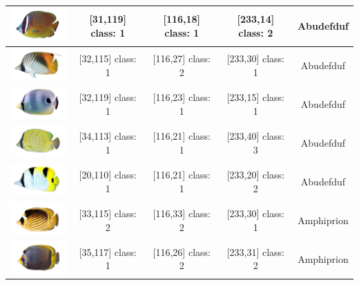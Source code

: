 \begin{longtable}{|c|c|c|c|c|}
	\includegraphics[width=3cm]{gambar/dataset_validasi/Chaetodon09} & [31,119] class: 1 & [116,18] class: 1 & [233,14] class: 2 & Abudefduf \\ \hline
	\includegraphics[width=3cm]{gambar/dataset_validasi/Chaetodon10} & [32,115] class: 1 & [116,27] class: 2 & [233,30] class: 1 & Abudefduf \\ \hline
	\includegraphics[width=3cm]{gambar/dataset_validasi/Chaetodon11} & [32,119] class: 1 & [116,23] class: 1 & [233,15] class: 1 & Abudefduf \\ \hline
	\includegraphics[width=3cm]{gambar/dataset_validasi/Chaetodon12} & [34,113] class: 1 & [116,21] class: 1 & [233,40] class: 3 & Abudefduf \\ \hline
	\includegraphics[width=3cm]{gambar/dataset_validasi/Chaetodon13} & [20,110] class: 1 & [116,21] class: 1 & [233,20] class: 2 & Abudefduf \\ \hline
	\includegraphics[width=3cm]{gambar/dataset_validasi/Chaetodon14} & [33,115] class: 2 & [116,33] class: 2 & [233,30] class: 1 & Amphiprion \\ \hline
	\includegraphics[width=3cm]{gambar/dataset_validasi/Chaetodon15} & [35,117] class: 1 & [116,26] class: 2 & [233,31] class: 2 & Amphiprion \\ \hline

\end{longtable}
